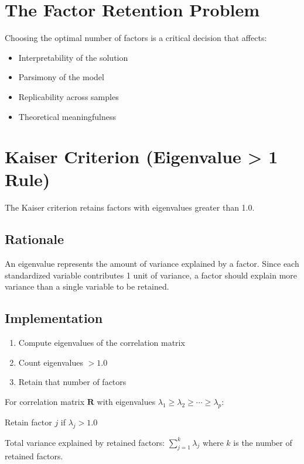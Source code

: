 \documentclass[a4paper]{tufte-book}
\begin{document}
\section{The Factor Retention Problem}

Choosing the optimal number of factors is a critical decision that affects:
\begin{itemize}
\item Interpretability of the solution
\item Parsimony of the model
\item Replicability across samples
\item Theoretical meaningfulness
\end{itemize}


\section{Kaiser Criterion (Eigenvalue > 1 Rule)}

The Kaiser criterion retains factors with eigenvalues greater than 1.0.

\subsection{Rationale}

An eigenvalue represents the amount of variance explained by a factor. Since each standardized variable contributes 1 unit of variance, a factor should explain more variance than a single variable to be retained.

\subsection{Implementation}

\begin{enumerate}
\item Compute eigenvalues of the correlation matrix
\item Count eigenvalues $> 1.0$
\item Retain that number of factors
\end{enumerate}

\begin{mathconcept}
For correlation matrix $\mathbf{R}$ with eigenvalues $\lambda_1 \geq \lambda_2 \geq \cdots \geq \lambda_p$:

Retain factor $j$ if $\lambda_j > 1.0$

Total variance explained by retained factors: $\sum_{j=1}^{k} \lambda_j$ where $k$ is the number of retained factors.
\end{mathconcept}
\end{document}
